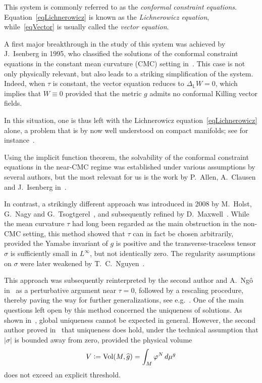 \documentclass[a4paper, 10pt, reqno]{amsart}
\theoremstyle{plain}
\theoremstyle{remark}
\theoremstyle{definition}
\renewcommand{\phi}{\varphi}
\newcommand{\bL}{\mathbb{L}}
\newcommand{\ghat}{{\widehat{g}}}
\newcommand{\definedas}{\mathrel{\raise.095ex\hbox{\rm :}\mkern-5.2mu=}}
\DeclareMathOperator{\vol}{Vol}
\begin{document}
This system is commonly referred to as the \emph{conformal constraint
    equations}. Equation~\eqref{eqLichnerowicz} is known as the \emph{Lichnerowicz
    equation}, while~\eqref{eqVector} is usually called the \emph{vector equation}.

A first major breakthrough in the study of this system was achieved by
J.~Isenberg in 1995, who classified the solutions of the conformal constraint
equations in the constant mean curvature (CMC) setting in~\cite{Isenberg}. This
case is not only physically relevant, but also leads to a striking
simplification of the system. Indeed, when $\tau$ is constant, the vector
equation reduces to $\Delta_{\bL} W = 0$, which implies that $W \equiv 0$
provided that the metric $g$ admits no conformal Killing vector fields.

In this situation, one is thus left with the Lichnerowicz
equation~\eqref{eqLichnerowicz} alone, a problem that is by now well understood
on compact manifolds; see for instance~\cite{GicquaudLichnerowicz}.

Using the implicit function theorem, the solvability of the conformal
constraint equations in the near-CMC regime was established under various
assumptions by several authors, but the most relevant for us is the work by
P.~Allen, A.~Clausen and J.~Isenberg in~\cite{ACI08}.

In contrast, a strikingly different approach was introduced in 2008 by
M.~Holst, G.~Nagy and G.~Tsogtgerel~\cite{HNT1, HNT2}, and subsequently refined
by D.~Maxwell~\cite{MaxwellNonCMC}. While the mean curvature $\tau$ had long
been regarded as the main obstruction in the non-CMC setting, this method
showed that $\tau$ can in fact be chosen arbitrarily, provided the Yamabe
invariant of $g$ is positive and the transverse-traceless tensor $\sigma$ is
sufficiently small in $L^\infty$, but not identically zero. The regularity
assumptions on $\sigma$ were later weakened by T.~C.~Nguyen~\cite{Nguyen}.

This approach was subsequently reinterpreted by the second author and A.~Ngô
in~\cite{GicquaudNgo} as a perturbative argument near $\tau = 0$, followed by a
rescaling procedure, thereby paving the way for further generalizations, see
e.g.~\cite{GicquaudNguyen,GicquaudSmallTT}. One of the main questions left open
by this method concerned the uniqueness of solutions. As shown
in~\cite{Nguyen2}, global uniqueness cannot be expected in general. However,
the second author proved in~\cite{GicquaudUniqueness} that uniqueness does
hold, under the technical assumption that $|\sigma|$ is bounded away from zero,
provided the physical volume
\[
    V \definedas \vol(M, \ghat) = \int_M \phi^{N} \, d\mu^g
\]
does not exceed an explicit threshold.
\end{document}
